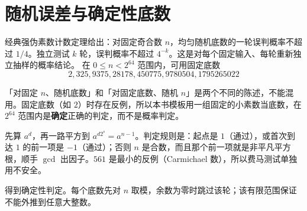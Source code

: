 \documentclass[UTF8,a4paper,11pt,twoside,openright,fontset=fandol]{ctexbook}
\theoremstyle{definition}
\begin{document}
\section{随机误差与确定性底数}
经典强伪素数计数定理给出：对固定奇合数 $n$，均匀随机底数的一轮误判概率不超过 $1/4$。独立测试 $k$ 轮，误判概率不超过 $4^{-k}$。这是对每个固定输入、每轮重新独立抽样的概率结论。
在 $0\le n<2^{64}$ 范围内，可用固定底数
\[
 2,325,9375,28178,450775,9780504,1795265022
\]

\begin{tip}[口径：随机的是底数还是模数]
「对固定 $n$、随机底数」和「对固定底数、随机 $n$」是两个不同的陈述，不能混用。固定底数（如 $2$）时存在反例，所以本书模板用一组固定的小素数当底数，在 $2^{64}$ 范围内是\textbf{确定}正确的判定，而不是概率判定。
\end{tip}

\begin{tip}[读一条测试链的方法]
先算 $a^d$，再一路平方到 $a^{d2^s}=a^{n-1}$。判定规则是：起点是 $1$（通过），或首次到达 $1$ 的前一项是 $-1$（通过）；否则 $n$ 是合数，而且那个前一项就是非平凡平方根，顺手 $\gcd$ 出因子。$561$ 是最小的反例（Carmichael 数），所以费马测试单独用不安全。
\end{tip}

得到确定性判定。每个底数先对 $n$ 取模，余数为零时跳过该轮；该有限范围保证不能外推到任意大整数。
\end{document}
